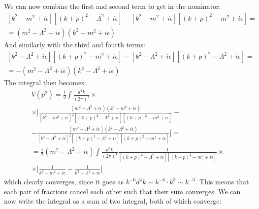 \documentclass{article}
\begin{document}
We can now combine the first and second term to get in the nominator:
\begin{equation}
\begin{gathered}
    \left[k^2 - m^2 + i\epsilon\right]\left[(k + p)^2 - \Lambda^2 + i\epsilon\right] - \left[k^2 - m^2 + i\epsilon\right]\left[(k + p)^2 - m^2 + i\epsilon\right] = \\ =\left(m^2 - \Lambda^2 + i\epsilon\right)\left(k^2 - m^2 + i\epsilon\right)
\end{gathered}
\end{equation}
And similarly with the third and fourth terms:
\begin{equation}
\begin{gathered}
    \left[k^2 - \Lambda^2 + i\epsilon\right]\left[(k + p)^2 - m^2 + i\epsilon\right] - \left[k^2 - \Lambda^2 + i\epsilon\right]\left[(k + p)^2 - \Lambda^2 + i\epsilon\right] = \\ = -\left(m^2 - \Lambda^2 + i\epsilon\right)\left(k^2 - \Lambda^2 + i\epsilon\right)
\end{gathered}
\end{equation}
The integral then becomes:
\begin{equation}
\begin{gathered}
    V\left(p^2\right) = \frac{i}{2}\int \frac{d^4k}{(2\pi)^4} \times \\ \times \Bigg[
        \frac{\left(m^2 - \Lambda^2 + i\epsilon\right)\left(k^2 - m^2 + i\epsilon\right)}{\left[k^2 - m^2 + i\epsilon\right]^2\left[(k + p)^2 - \Lambda^2 + i\epsilon\right]\left[(k + p)^2 - m^2 + i\epsilon\right]} - \\ -
        \frac{\left(m^2 - \Lambda^2 + i\epsilon\right)\left(k^2 - \Lambda^2 + i\epsilon\right)}{\left[k^2 - \Lambda^2 + i\epsilon\right]^2\left[(k + p)^2 - \Lambda^2 + i\epsilon\right]\left[(k + p)^2 - m^2 + i\epsilon\right]}
    \Bigg] = \\ =
    \frac{i}{2}\left(m^2 - \Lambda^2 + i\epsilon\right)\int \frac{d^4k}{(2\pi)^4}
    \frac{1}{\left[(k + p)^2 - \Lambda^2 + i\epsilon\right]\left[(k + p)^2 - m^2 + i\epsilon\right]}
    \times \\ \times \Bigg[
        \frac{1}{k^2 - m^2 + i\epsilon} -
        \frac{1}{k^2 - \Lambda^2 + i\epsilon}
    \Bigg]
\end{gathered}
\end{equation}
which clearly converges, since it goes as $k^{-6}d^4k \sim k^{-6}\cdot k^3 \sim k^{-3}$. This means that each pair of fractions cancel each other such that their sum converges. We can now write the integral as a sum of two integral, both of which converge:
\end{document}
